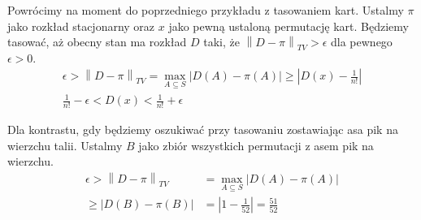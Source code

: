 \begin{example}
	Powrócimy na moment do poprzedniego przykładu z tasowaniem kart. Ustalmy \(\pi\) jako rozkład stacjonarny oraz \(x\) jako pewną ustaloną permutację kart.
	Będziemy tasować, aż obecny stan ma rozkład \(D\) taki, że \(\left\|D-\pi\right\|_{TV} > \epsilon\) dla pewnego \(\epsilon > 0\).
	\begin{align*}
		\epsilon > \left\|D-\pi\right\|_{TV} = \max_{A \subseteq S}\left|D(A) - \pi(A)\right|
		\ge \left|D(x) - \frac{1}{n!}\right| \\
		\frac{1}{n!} - \epsilon < D(x) < \frac{1}{n!} + \epsilon
	\end{align*}
\end{example}

\begin{example}
	Dla kontrastu, gdy będziemy oszukiwać przy tasowaniu zostawiając asa pik na wierzchu talii.
	Ustalmy \(B\) jako zbiór wszystkich permutacji z asem pik na wierzchu.
	\begin{align*}
		\epsilon > \left\|D-\pi\right\|_{TV} & = \max_{A \subseteq S}\left|D(A) - \pi(A)\right| \\
		\ge \left|D(B) - \pi(B)\right|       & = \left|1 - \frac{1}{52}\right| = \frac{51}{52}
	\end{align*}
\end{example}
